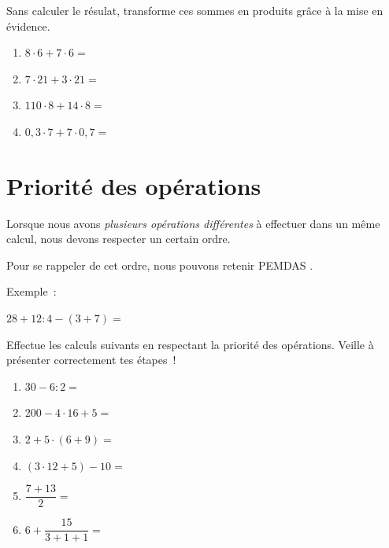 \documentclass[syllabus_1.tex]{subfiles}
\begin{document}
\begin{exercise}
    Sans calculer le résulat, transforme ces sommes en produits grâce à la mise en évidence.
    \begin{enumerate}[cols=2, itemsep=2cm]
        \item \(8 \cdot 6 + 7 \cdot 6 =\)
        \item \(7 \cdot 21 + 3 \cdot 21 =\)
        \item \(110 \cdot 8 + 14 \cdot 8 =\)
        \item \(0,3 \cdot 7 + 7 \cdot 0,7 =\)
    \end{enumerate}
    \vspace*{2cm}
\end{exercise}


\section{Priorité des opérations}

Lorsque nous avons \emph{plusieurs opérations différentes} à effectuer
dans un même calcul, nous devons respecter un certain ordre.

Pour se rappeler de cet ordre, nous pouvons retenir \og PEMDAS \fg.
\begin{center}
\end{center}

Exemple~:

\(28 + 12:4 - (3 + 7) =\)
\vspace*{5cm}

\begin{exercise}
    Effectue les calculs suivants en respectant la priorité des opérations. Veille à présenter correctement tes étapes~!
    \begin{enumerate}[cols=2, itemsep=3cm]
        \item \(30 - 6:2 =\)
        \item \(200 - 4 \cdot 16 + 5 =\)
        \item \(2 + 5 \cdot (6 + 9) =\)
        \item \((3 \cdot 12 + 5) - 10 =\)
        \item $\dfrac{7+13}{2}=$
        \item $6 + \dfrac{15}{3+1+1}=$
    \end{enumerate}
    \vspace*{3cm}
\end{exercise}
\end{document}

